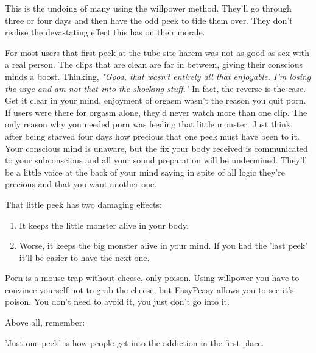\documentclass[easypeasy.tex]{subfiles}
\begin{document}
This is the undoing of many using the willpower method. They'll go through three or four days and then have the odd peek to tide them over. They don't realise the devastating effect this has on their morale. 

For most users that first peek at the tube site harem was not as good as sex with a real person. The clips that are clean are far in between, giving their conscious minds a boost. Thinking, \textit{"Good, that wasn't entirely all that enjoyable. I'm losing the urge and am not that into the shocking stuff."} In fact, the reverse is the case. Get it clear in your mind, enjoyment of orgasm wasn't the reason you quit porn. If users were there for orgasm alone, they'd never watch more than one clip. The only reason why you needed porn was feeding that little monster. Just think, after being starved four days how precious that one peek must have been to it. Your conscious mind is unaware, but the fix your body received is communicated to your subconscious and all your sound preparation will be undermined. They'll be a little voice at the back of your mind saying in spite of all logic they're precious and that you want another one.

That little peek has two damaging effects:
\begin{enumerate}
  \item It keeps the little monster alive in your body.
  \item Worse, it keeps the big monster alive in your mind. If you had the 'last peek' it'll be easier to have the next one.
\end{enumerate}

Porn is a mouse trap without cheese, only poison. Using willpower you have to convince yourself not to grab the cheese, but EasyPeasy allows you to see it's poison. You don't need to avoid it, you just don't go into it.

Above all, remember:

  {\huge 'Just one peek' is how people get into the addiction in the first place.}
\end{document}
